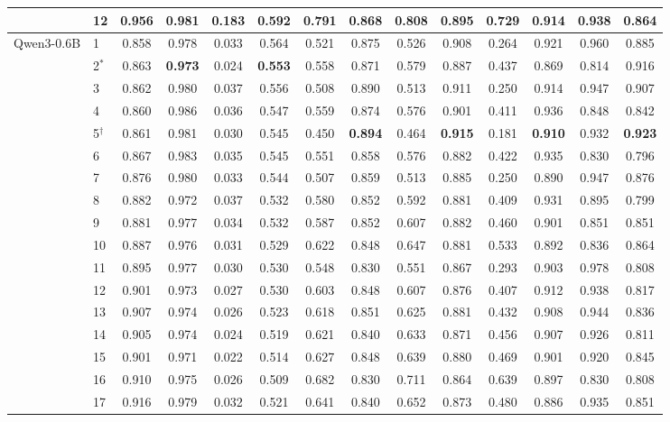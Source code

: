\begin{table}[p]
\begin{tabular}{llcccccccccccc}
 & 12 & 0.956 & 0.981 & 0.183 & 0.592 & 0.791 & 0.868 & 0.808 & 0.895 & 0.729 & 0.914 & 0.938 & 0.864 \\
\midrule
Qwen3-0.6B & 1 & 0.858 & 0.978 & 0.033 & 0.564 & 0.521 & 0.875 & 0.526 & 0.908 & 0.264 & 0.921 & 0.960 & 0.885 \\
 & 2$^{\ast}$ & 0.863 & \textbf{0.973} & 0.024 & \textbf{0.553} & 0.558 & 0.871 & 0.579 & 0.887 & 0.437 & 0.869 & 0.814 & 0.916 \\
 & 3 & 0.862 & 0.980 & 0.037 & 0.556 & 0.508 & 0.890 & 0.513 & 0.911 & 0.250 & 0.914 & 0.947 & 0.907 \\
 & 4 & 0.860 & 0.986 & 0.036 & 0.547 & 0.559 & 0.874 & 0.576 & 0.901 & 0.411 & 0.936 & 0.848 & 0.842 \\
 & 5$^{\dagger}$ & 0.861 & 0.981 & 0.030 & 0.545 & 0.450 & \textbf{0.894} & 0.464 & \textbf{0.915} & 0.181 & \textbf{0.910} & 0.932 & \textbf{0.923} \\
 & 6 & 0.867 & 0.983 & 0.035 & 0.545 & 0.551 & 0.858 & 0.576 & 0.882 & 0.422 & 0.935 & 0.830 & 0.796 \\
 & 7 & 0.876 & 0.980 & 0.033 & 0.544 & 0.507 & 0.859 & 0.513 & 0.885 & 0.250 & 0.890 & 0.947 & 0.876 \\
 & 8 & 0.882 & 0.972 & 0.037 & 0.532 & 0.580 & 0.852 & 0.592 & 0.881 & 0.409 & 0.931 & 0.895 & 0.799 \\
 & 9 & 0.881 & 0.977 & 0.034 & 0.532 & 0.587 & 0.852 & 0.607 & 0.882 & 0.460 & 0.901 & 0.851 & 0.851 \\
 & 10 & 0.887 & 0.976 & 0.031 & 0.529 & 0.622 & 0.848 & 0.647 & 0.881 & 0.533 & 0.892 & 0.836 & 0.864 \\
 & 11 & 0.895 & 0.977 & 0.030 & 0.530 & 0.548 & 0.830 & 0.551 & 0.867 & 0.293 & 0.903 & 0.978 & 0.808 \\
 & 12 & 0.901 & 0.973 & 0.027 & 0.530 & 0.603 & 0.848 & 0.607 & 0.876 & 0.407 & 0.912 & 0.938 & 0.817 \\
 & 13 & 0.907 & 0.974 & 0.026 & 0.523 & 0.618 & 0.851 & 0.625 & 0.881 & 0.432 & 0.908 & 0.944 & 0.836 \\
 & 14 & 0.905 & 0.974 & 0.024 & 0.519 & 0.621 & 0.840 & 0.633 & 0.871 & 0.456 & 0.907 & 0.926 & 0.811 \\
 & 15 & 0.901 & 0.971 & 0.022 & 0.514 & 0.627 & 0.848 & 0.639 & 0.880 & 0.469 & 0.901 & 0.920 & 0.845 \\
 & 16 & 0.910 & 0.975 & 0.026 & 0.509 & 0.682 & 0.830 & 0.711 & 0.864 & 0.639 & 0.897 & 0.830 & 0.808 \\
 & 17 & 0.916 & 0.979 & 0.032 & 0.521 & 0.641 & 0.840 & 0.652 & 0.873 & 0.480 & 0.886 & 0.935 & 0.851 \\

\end{tabular}
\end{table}
